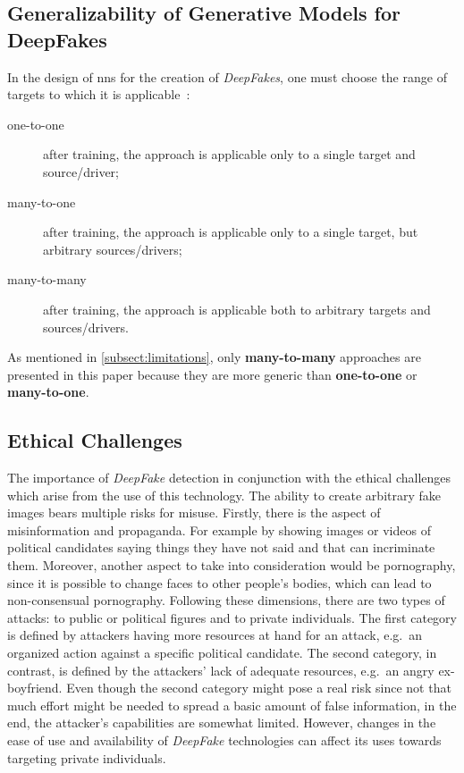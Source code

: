 \subsection{Generalizability of Generative Models for DeepFakes}\label{subsubsect:generalizability-deepfakes}
In the design of \glspl{nn} for the creation of \textit{DeepFakes}, one must choose
the range of targets to which it is applicable~\cite[cf.][]{Mirsky.2020}:
\begin{description}
    \item[one-to-one] after training, the approach is applicable only to a
    single target and source/driver;
    \item[many-to-one] after training, the approach is applicable only to a
    single target, but arbitrary sources/drivers;
    \item[many-to-many] after training, the approach is applicable both to
    arbitrary targets and sources/drivers.
\end{description}
As mentioned in \cref{subsect:limitations}, only \textbf{many-to-many} approaches
are presented in this paper because they are more generic than \textbf{one-to-one} or
\textbf{many-to-one}.

\subsection{Ethical Challenges}
The importance of \textit{DeepFake} detection in conjunction with the ethical
challenges which arise from the use of this technology. The ability to create
arbitrary fake images bears multiple risks for misuse. Firstly, there is the
aspect of misinformation and propaganda. For example by showing images or videos
of political candidates saying things they have not said and that can incriminate
them. Moreover, another aspect to take into consideration would be pornography,
since it is possible to change faces to other people's bodies, which can lead to
non-consensual pornography. Following these dimensions, there are two types of attacks: to public or political figures and to private individuals. The first category
is defined by attackers having more resources at hand for an attack, e.g.\ an
organized action against a specific political candidate. The second category, in 
contrast, is defined by the attackers' lack of adequate resources, e.g.\ an angry 
ex-boyfriend. Even though the second category might pose a real risk since not 
that much effort might be needed to spread a basic amount of false information, in the 
end, the attacker's capabilities are somewhat limited. However, changes in the ease of use and 
availability of \textit{DeepFake} technologies can affect its uses towards targeting
private individuals.